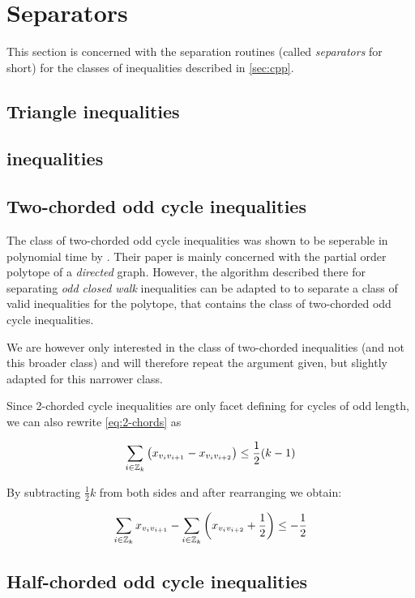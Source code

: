 \section{Separators}\label{sec:sep}
This section is concerned with the separation routines (called \textit{separators} for short) for the classes of inequalities described in \cref{sec:cpp}.

\subsection{Triangle inequalities}\label{subsec:triangel_separator}

\subsection{\texorpdfstring{\ST}{[S:T]} inequalities}\label{subsec:st_separator}

\subsection{Two-chorded odd cycle inequalities}
The class of two-chorded odd cycle inequalities was shown to be seperable in polynomial time by \cite{mullerPartialOrderPolytope1996}.
Their paper is mainly concerned with the partial order polytope of a \textit{directed} graph.
However, the algorithm described there for separating \textit{odd closed walk} inequalities can be adapted to to separate a class of valid inequalities for the \CP polytope, that contains the class of two-chorded odd cycle inequalities.

We are however only interested in the class of two-chorded inequalities (and not this broader class) and will therefore repeat the argument given, but slightly adapted for this narrower class.

Since 2-chorded cycle inequalities are only facet defining for cycles of odd length, we can also rewrite \ref{eq:2-chords} as

\begin{equation*}
	\sum_{i \in \mathbb{Z}_k} \left( x_{v_i v_{i+1}} - x_{v_i v_{i+2}} \right) \leq \frac{1}{2} (k-1)
\end{equation*}

By subtracting $\frac{1}{2}k$ from both sides and after rearranging we obtain:

\begin{equation*}
	\sum_{i \in \mathbb{Z}_k} x_{v_i v_{i+1}} - \sum_{i \in \mathbb{Z}_k} \left(x_{v_i v_{i+2}} + \frac{1}{2} \right) \leq -\frac{1}{2}
\end{equation*}


\subsection{Half-chorded odd cycle inequalities}

